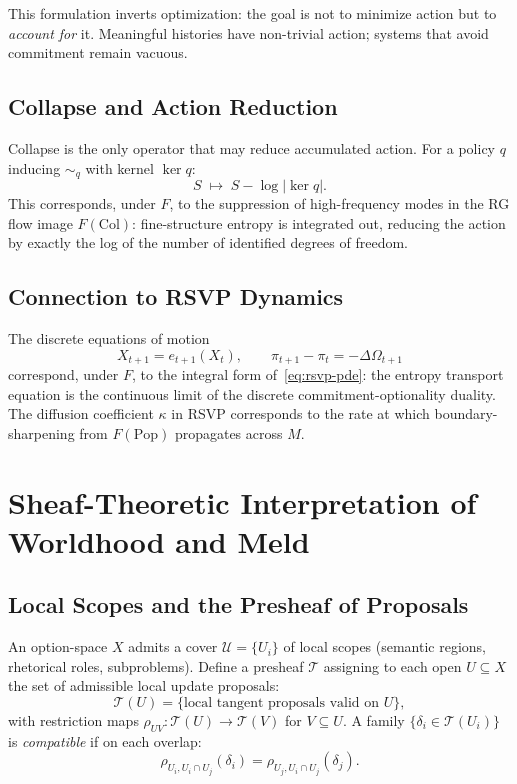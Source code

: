 \documentclass[12pt, a4paper]{article}
\theoremstyle{definition}
\theoremstyle{remark}
\newcommand{\Pop}{\mathrm{Pop}}
\newcommand{\Collapse}{\mathrm{Col}}
\begin{document}
This formulation inverts optimization: the goal is not to minimize action but to
\emph{account for} it. Meaningful histories have non-trivial action; systems that
avoid commitment remain vacuous.

\subsection{Collapse and Action Reduction}

Collapse is the only operator that may reduce accumulated action. For a policy $q$
inducing $\sim_q$ with kernel $\ker q$:
\begin{equation}
  S \;\longmapsto\; S - \log|\ker q|.
  \label{eq:collapse-action}
\end{equation}
This corresponds, under $F$, to the suppression of high-frequency modes in the RG flow
image $F(\Collapse)$: fine-structure entropy is integrated out, reducing the action by
exactly the log of the number of identified degrees of freedom.

\subsection{Connection to RSVP Dynamics}

The discrete equations of motion
\[
  X_{t+1} = e_{t+1}(X_t), \qquad \pi_{t+1} - \pi_t = -\Delta\Omega_{t+1}
\]
correspond, under $F$, to the integral form of~\eqref{eq:rsvp-pde}: the entropy
transport equation is the continuous limit of the discrete commitment-optionality
duality. The diffusion coefficient $\kappa$ in RSVP corresponds to the rate at which
boundary-sharpening from $F(\Pop)$ propagates across $M$.

\section{Sheaf-Theoretic Interpretation of Worldhood and Meld}
\label{sec:sheaf}

\subsection{Local Scopes and the Presheaf of Proposals}

An option-space $X$ admits a cover $\mathcal{U} = \{U_i\}$ of local scopes
(semantic regions, rhetorical roles, subproblems). Define a presheaf $\mathcal{T}$
assigning to each open $U \subseteq X$ the set of admissible local update proposals:
\[
  \mathcal{T}(U) = \{\text{local tangent proposals valid on } U\},
\]
with restriction maps $\rho_{UV} : \mathcal{T}(U) \to \mathcal{T}(V)$ for $V \subseteq U$.
A family $\{\delta_i \in \mathcal{T}(U_i)\}$ is \emph{compatible} if on each overlap:
\[
  \rho_{U_i, U_i \cap U_j}(\delta_i) = \rho_{U_j, U_i \cap U_j}(\delta_j).
\]
\end{document}
